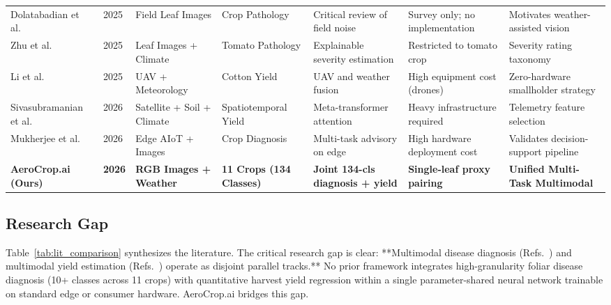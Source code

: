 \documentclass[conference]{IEEEtran}
\begin{document}
\begin{table}[t]
\begin{tabular}{@{}lllllll@{}}
Dolatabadian et al.~\cite{dolatabadian2025} & 2025 & Field Leaf Images & Crop Pathology & Critical review of field noise & Survey only; no implementation & Motivates weather-assisted vision \\
Zhu et al.~\cite{zhu2025} & 2025 & Leaf Images + Climate & Tomato Pathology & Explainable severity estimation & Restricted to tomato crop & Severity rating taxonomy \\
Li et al.~\cite{li2025} & 2025 & UAV + Meteorology & Cotton Yield & UAV and weather fusion & High equipment cost (drones) & Zero-hardware smallholder strategy \\
Sivasubramanian et al.~\cite{sivasubramanian2026} & 2026 & Satellite + Soil + Climate & Spatiotemporal Yield & Meta-transformer attention & Heavy infrastructure required & Telemetry feature selection \\
Mukherjee et al.~\cite{mukherjee2026} & 2026 & Edge AIoT + Images & Crop Diagnosis & Multi-task advisory on edge & High hardware deployment cost & Validates decision-support pipeline \\
\midrule
\textbf{AeroCrop.ai (Ours)} & \textbf{2026} & \textbf{RGB Images + Weather} & \textbf{11 Crops (134 Classes)} & \textbf{Joint 134-cls diagnosis + yield} & \textbf{Single-leaf proxy pairing} & \textbf{Unified Multi-Task Multimodal} \\
\bottomrule
\end{tabular}
\end{table}

\subsection{Research Gap}

Table~\ref{tab:lit_comparison} synthesizes the literature. The critical research gap is clear: **Multimodal disease diagnosis (Refs.~\cite{mohanty2016, dolatabadian2025, zhang2024, almadhor2023, zhu2025, khan2024, ferentinos2018, mukherjee2026}) and multimodal yield estimation (Refs.~\cite{sivasubramanian2026, tseng2023, gadiraju2020, nevavuori2019, feng2024, li2025, cao2021}) operate as disjoint parallel tracks.** No prior framework integrates high-granularity foliar disease diagnosis (10+ classes across 11 crops) with quantitative harvest yield regression within a single parameter-shared neural network trainable on standard edge or consumer hardware. AeroCrop.ai bridges this gap.

\end{document}

